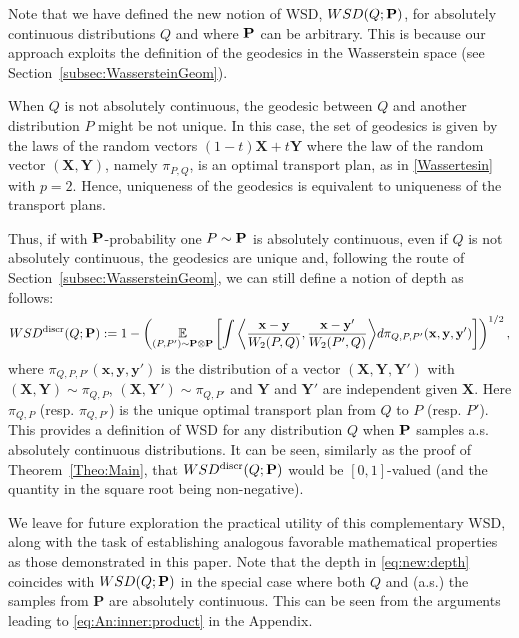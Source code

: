 \documentclass{imsart}
\numberwithin{equation}{section}
\def\E{\mathbb{E}}
\def\x{\mathbf{x}}
\def\y{\mathbf{y}}
\def\X{\mathbf{X}}
\def\Y{\mathbf{Y}}
\def\E{\mathbb E}
\def\x{\mathbf x}
\def\y{\mathbf y}
\begin{document}
Note that we have defined the new notion of WSD,
$ {\rm WSD}(Q; {\bf P})$,
for absolutely continuous distributions $Q$ and where ${\bf P}$ can be arbitrary. This is because our approach exploits the definition of the geodesics in the Wasserstein space (see Section~\ref{subsec:WassersteinGeom}). 

When $Q$ is not absolutely continuous, the geodesic between $Q$ and another distribution $P$ might be not unique.
In this case, the set of geodesics is given by the laws of the random vectors $(1-t)\X+ t\Y$ where the law of the random vector $(\X,\Y)$, namely $\pi_{P,Q}$, is an optimal transport plan, as in \eqref{Wassertesin} with $p=2$.
Hence, uniqueness of the geodesics is equivalent to uniqueness of the transport plans.  


Thus, if with ${\bf P}$-probability one  $P \sim {\bf P}$ is absolutely continuous, even if $Q$ is not absolutely continuous, the geodesics are unique and, following the route of Section~\ref{subsec:WassersteinGeom},  we can still define a notion of depth as follows: 
\begin{equation} \label{eq:new:depth}
	\rm WSD^{\text{discr}}(Q; {\bf P})
	:=
	1-
	\left( 
	\underset{{(P,P')\sim \mathbf{P}\otimes \mathbf{P}}}{ \E}
	\left[ \int  {\left\langle
		\frac{\x-\y }{W_2(P,Q)} , 
		\frac{\x-\y' }{W_2(P',Q)} \right\rangle }d\pi_{Q,P,P'}(\x,\y, \y' ) \right]\right)^{1/2},
\end{equation} 
where $\pi_{Q,P,P'}(\x,\y, \y' )$ is the distribution of a vector $(\X,\Y, \Y')$ with $(\X,\Y)\sim \pi_{Q,P}$, $(\X,\Y')\sim \pi_{Q,P'}$ and $\Y$ and $\Y'$ are independent given $\X$.
Here $\pi_{Q,P}$ (resp. $\pi_{Q,P'}$) is the unique optimal transport plan from $Q$ to $P$ (resp. $P'$).
This provides a  definition of WSD for any distribution $Q$ when ${\bf P}$ samples a.s. absolutely continuous distributions.
It can be seen, similarly as the proof of Theorem~\ref{Theo:Main}, that $ \rm WSD^{\text{discr}}(Q; {\bf P})$ would be $[0,1]$-valued (and the quantity in the square root being non-negative). 

We leave for future exploration the practical utility of this complementary WSD, along with the task of establishing analogous favorable mathematical properties as those demonstrated in this paper. Note that the depth in \eqref{eq:new:depth} coincides with $ {\rm WSD}(Q; {\bf P})$ in the special case where both $Q$ and (a.s.) the samples from {\bf P} are absolutely continuous. This can be seen from the arguments leading to \eqref{eq:An:inner:product} in the Appendix. 
\end{document}
